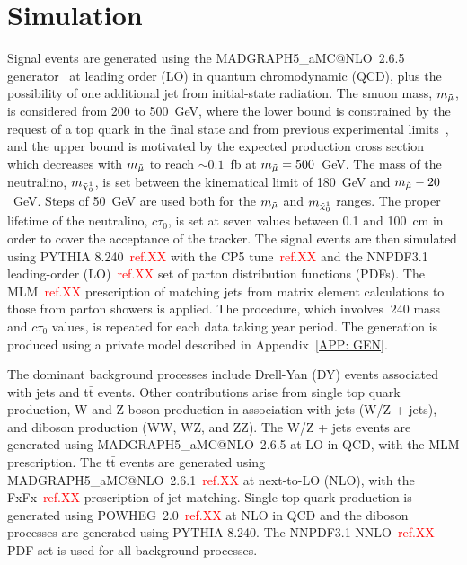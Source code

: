 \documentclass{cernatlasnote}
\newcommand{\ttbar}{t$\bar{\text{t}}$\xspace}
\begin{document}
\section{Simulation}
\label{SEC: MC}

Signal events are generated using the MADGRAPH5\_aMC@NLO~2.6.5 generator~\cite{MAD} at leading order (LO) in quantum chromodynamic (QCD), plus the possibility of one additional jet from initial-state radiation. The smuon mass, $m_{\Tilde{\mu}}$, is considered from 200 to 500~GeV, where the lower bound is constrained by the request of a top quark in the final state and from previous experimental limits~\cite{ATLAS1,ATLAS2,ATLAS3,CMS1,ATLAS4,CMS2,ATLAS5}, and the upper bound is motivated by the expected production cross section which decreases with $m_{\Tilde{\mu}}$ to reach $\sim 0.1$~fb at $m_{\Tilde{\mu}} = 500$~GeV. The mass of the neutralino, $m_{\Tilde{\chi}_{0}^{1}}$, is set between the kinematical limit of 180~GeV and $m_{\Tilde{\mu}} - 20$~GeV. Steps of 50~GeV are used both for the $m_{\Tilde{\mu}}$ and $m_{\Tilde{\chi}_{0}^{1}}$ ranges. The proper lifetime of the neutralino, $c\tau_0$, is set at seven values between 0.1 and 100~cm in order to cover the acceptance of the tracker. The signal events are then simulated using PYTHIA 8.240~\textcolor{red}{ref.XX} with the CP5 tune~\textcolor{red}{ref.XX} and the NNPDF3.1 leading-order (LO)~\textcolor{red}{ref.XX} set of parton distribution functions (PDFs). The MLM~\textcolor{red}{ref.XX} prescription of matching jets from matrix element calculations to those from parton showers is applied. The procedure, which involves $~240$ mass and $c\tau_0$ values, is repeated for each data taking year period.
\newline \smallskip
The generation is produced using a private model described in Appendix~\ref{APP: GEN}. 
\smallskip

The dominant background processes include Drell-Yan (DY) events associated with jets and \ttbar events. Other contributions arise from single top quark production, W and Z boson production in association with jets (W/Z + jets), and diboson production (WW, WZ, and ZZ). The W/Z + jets events are generated using MADGRAPH5\_aMC@NLO~2.6.5 at LO in QCD, with the MLM prescription. The \ttbar events are generated using MADGRAPH5\_aMC@NLO~2.6.1~\textcolor{red}{ref.XX} at next-to-LO (NLO), with the FxFx~\textcolor{red}{ref.XX} prescription of jet matching. Single top quark production is generated using POWHEG~2.0~\textcolor{red}{ref.XX} at NLO in QCD and the diboson processes are generated using PYTHIA 8.240. The NNPDF3.1 NNLO~\textcolor{red}{ref.XX} PDF set is used for all background processes.
\end{document}

